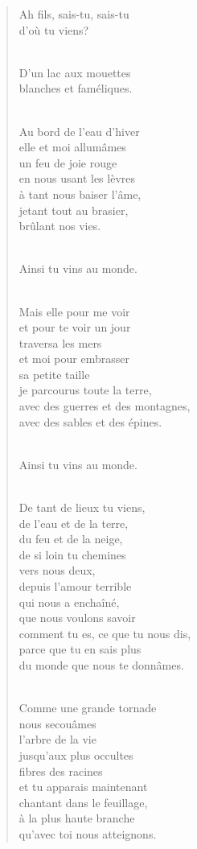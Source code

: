 \documentclass[11pt,a4paper]{book}
\begin{document}
\begin{verse}
Ah fils, sais-tu, sais-tu \\
d'où tu viens? \\ \

D'un lac aux mouettes \\
blanches et faméliques. \\ \

Au bord de l'eau d'hiver \\
elle et moi allumâmes \\
un feu de joie rouge \\
en nous usant les lèvres \\
à tant nous baiser l'âme, \\
jetant tout au brasier, \\
brûlant nos vies. \\ \

Ainsi tu vins au monde. \\ \

Mais elle pour me voir \\
et pour te voir un jour \\
traversa les mers \\
et moi pour embrasser \\
sa petite taille \\
je parcourus toute la terre, \\
avec des guerres et des montagnes, \\
avec des sables et des épines. \\ \

Ainsi tu vins au monde. \\ \

De tant de lieux tu viens, \\
de l'eau et de la terre, \\
du feu et de la neige, \\
de si loin tu chemines \\
vers nous deux, \\
depuis l'amour terrible \\
qui nous a enchaîné, \\
que nous voulons savoir \\
comment tu es, ce que tu nous dis, \\
parce que tu en sais plus \\
du monde que nous te donnâmes. \\ \

Comme une grande tornade \\
nous secouâmes \\
l'arbre de la vie \\
jusqu'aux plus occultes \\
fibres des racines \\
et tu apparais maintenant \\
chantant dans le feuillage, \\
à la plus haute branche \\
qu'avec toi nous atteignons.
\end{verse}
\end{document}
